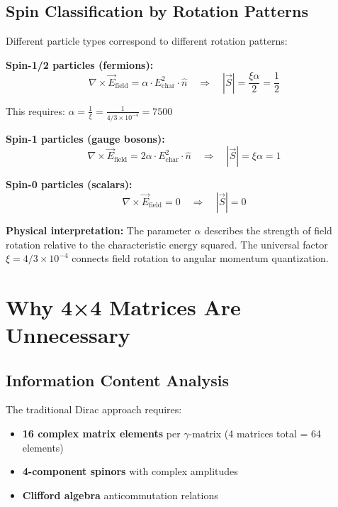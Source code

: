 \documentclass[12pt,a4paper]{report}
\begin{document}
\subsection{Spin Classification by Rotation Patterns}
\label{subsec:spin_classification}

Different particle types correspond to different rotation patterns:

\textbf{Spin-1/2 particles (fermions):}
\begin{equation}
	\nabla \times \vec{E}_{\text{field}} = \alpha \cdot E_{\text{char}}^2 \cdot \hat{n} \quad \Rightarrow \quad |\vec{S}| = \frac{\xi \alpha}{2} = \frac{1}{2}
\end{equation}

This requires: $\alpha = \frac{1}{\xi} = \frac{1}{4/3 \times 10^{-4}} = 7500$

\textbf{Spin-1 particles (gauge bosons):}
\begin{equation}
	\nabla \times \vec{E}_{\text{field}} = 2\alpha \cdot E_{\text{char}}^2 \cdot \hat{n} \quad \Rightarrow \quad |\vec{S}| = \xi \alpha = 1
\end{equation}

\textbf{Spin-0 particles (scalars):}
\begin{equation}
	\nabla \times \vec{E}_{\text{field}} = 0 \quad \Rightarrow \quad |\vec{S}| = 0
\end{equation}

\textbf{Physical interpretation:}
The parameter $\alpha$ describes the strength of field rotation relative to the characteristic energy squared. The universal factor $\xi = 4/3 \times 10^{-4}$ connects field rotation to angular momentum quantization.

\section{Why 4×4 Matrices Are Unnecessary}
\label{sec:matrix_elimination_justification}

\subsection{Information Content Analysis}
\label{subsec:information_content}

The traditional Dirac approach requires:
\begin{itemize}
	\item \textbf{16 complex matrix elements} per $\gamma$-matrix (4 matrices total = 64 elements)
	\item \textbf{4-component spinors} with complex amplitudes
	\item \textbf{Clifford algebra} anticommutation relations
\end{itemize}
\end{document}
